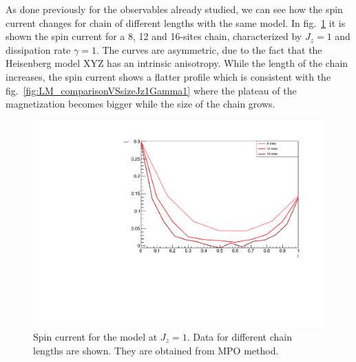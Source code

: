 %
%
%

As done previously for the observables already studied, we can see how the spin current changes for chain of different lengths with the same model. In fig.~\ref{fig:NORM_SpinCurr_comparisonVSsize} it is shown the spin current for a 8, 12 and 16-sites chain, characterized by $J_z = 1$ and dissipation rate $\gamma = 1$. The curves are asymmetric, due to the fact that the Heisenberg model XYZ has an intrinsic anisotropy. While the length of the chain increases, the spin current shows a flatter profile which is consistent with the fig.~\ref{fig:LM_comparisonVSsizeJz1Gamma1} where the plateau of the magnetization becomes bigger while the size of the chain grows.

\begin{figure}[H]
    \centering
    \includegraphics[scale=0.7]{Figures/NORM_SpinCurr_comparisonVSsize.pdf}
    \caption{Spin current for the model at $J_z = 1$. Data for different chain lengths are shown. They are obtained from MPO method.}
    \label{fig:NORM_SpinCurr_comparisonVSsize}
\end{figure}

